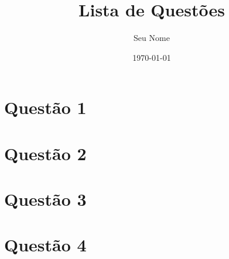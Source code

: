 \documentclass[a4paper,12pt]{article}
\title{Lista de Questões}
\author{Seu Nome}
\date{\today}
\begin{document}
\maketitle
\tableofcontents
\newpage

\begin{multicols}{2}
\section{Questão 1}
\lipsum[1]

\section{Questão 2}
\lipsum[2]

\section{Questão 3}
\lipsum[3]

\section{Questão 4}
\lipsum[4]
\end{multicols}
\end{document}
